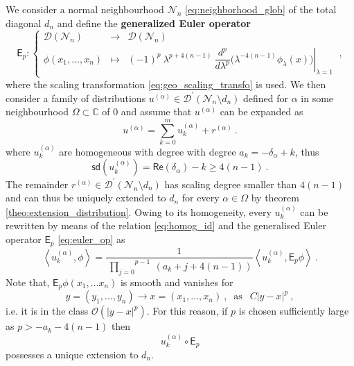 \documentclass[11pt]{book}
\newcommand{\sd}{\mathsf{sd}}
\renewcommand{\Re}{\mathsf{Re}}
\newcommand{\sm}[1]{\left\langle#1\right\rangle}
\newcommand{\Dcal}{\mathcal{D}}
\newcommand{\Ncal}{\mathcal{N}}
\newcommand{\Ocal}{\mathcal{O}}
\newcommand{\Cbb}{\mathbb{C}}
\newcommand{\Esf}{\mathsf{E}}
\theoremstyle{break}
\begin{document}
We consider a normal neighbourhood $\Ncal_n$ \eqref{eq:neighborhood_glob} of the total diagonal $d_n$ and define the \textbf{generalized Euler operator}\index{$\Esf_p$}
%
\begin{equation}
\Esf_p : \left\{
\begin{array}{lcl}
\Dcal(\Ncal_n) & \to & \Dcal(\Ncal_n) \\
\phi(x_1,\dots, x_n) & \mapsto & \left. (-1)^p \ \lambda^{p+4(n-1)} \ \dfrac{d^p}{d\lambda^p} \bigg( \lambda^{-4(n-1)}  \phi_\lambda(x) \bigg) \right|_{\lambda = 1}
\end{array}
\right. \ ,
\label{eq:euler_op}
%
\end{equation}
%
where the scaling transformation \eqref{eq:geo_scaling_transfo} is used. We then consider a family of distributions $u^{(\alpha)} \in \Dcal^\prime(\Ncal_n\setminus d_n)$ defined for $\alpha$ in some neighbourhood $\Omega \subset \Cbb$ of $0$ and assume that $u^{(\alpha)}$ can be expanded as
%
\begin{equation*}
u^{(\alpha)}  = \sum_{k=0}^m u^{(\alpha)}_k + r^{(\alpha)} \ . 
\end{equation*}
%
where $u^{(\alpha)}_k$ are homogeneous with degree with degree $a_k = - \delta_\alpha + k$, thus 
%
\begin{equation*}
\sd(u^{(\alpha)}_k) = \Re\left(\delta_\alpha\right) - k \geq 4(n-1) \ .
\end{equation*}
%
The remainder $r^{(\alpha)}\in \Dcal^\prime(\Ncal_n\setminus d_n)$ has scaling degree smaller than $4(n-1)$ and can thus be uniquely extended to $d_n$ for every $\alpha \in \Omega$ by theorem \ref{theo:extension_distribution}. Owing to its homogeneity, every $u^{(\alpha)}_k$ can be rewritten by means of the relation \eqref{eq:homog_id} and the generalised Euler operator $\Esf_p$ \eqref{eq:euler_op} as
%
\begin{equation}
\sm{ u^{(\alpha)}_k, \phi } = \frac{1}{\overset{p-1}{\ \underset{j=0}{\prod}} \ (a_k+j+4(n-1))}   \sm{ u^{(\alpha)}_k, \Esf_p \phi } \ .
\label{eq:expose_poles}
\end{equation}
%
Note that, $\Esf_p \phi(x_1, \dots x_n)$ is smooth and vanishes for
%
\begin{equation*}
y = (y_1 , \dots , y_n) \to x = (x_1, \dots , x_n) \ , \ \mbox{ as } \ \ C|y-x|^p \ , 
\end{equation*}
%
i.e. it is in the class $\Ocal(|y-x|^{p})$. For this reason, if  $p$ is chosen sufficiently large as $p > -a_k-4(n-1)$ then 
\begin{equation*}
u^{(\alpha)}_k \circ \Esf_p 
\end{equation*}
%
possesses a unique extension to $d_n$. 
\end{document}
